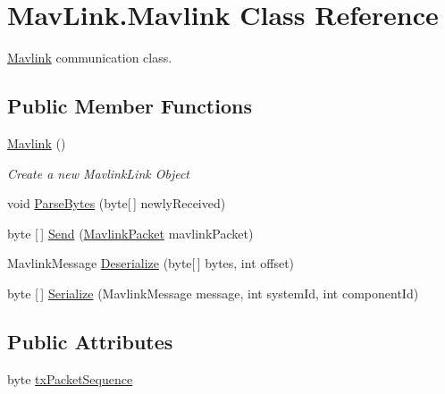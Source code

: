 \hypertarget{classMavLink_1_1Mavlink}{}\section{Mav\+Link.\+Mavlink Class Reference}
\label{classMavLink_1_1Mavlink}


\mbox{\hyperlink{classMavLink_1_1Mavlink}{Mavlink}} communication class.  


\subsection*{Public Member Functions}
\begin{DoxyCompactItemize}
\item 
\mbox{\hyperlink{classMavLink_1_1Mavlink_afe31f241e14b7a9df43494c3f777055f}{Mavlink}} ()
\begin{DoxyCompactList}\small\item\em Create a new Mavlink\+Link Object \end{DoxyCompactList}\item 
void \mbox{\hyperlink{classMavLink_1_1Mavlink_a2a1e66a440c767a640c92f00bdf5354d}{Parse\+Bytes}} (byte\mbox{[}$\,$\mbox{]} newly\+Received)
\item 
byte \mbox{[}$\,$\mbox{]} \mbox{\hyperlink{classMavLink_1_1Mavlink_a62a72045b3c41e9aade642a94af528aa}{Send}} (\mbox{\hyperlink{classMavLink_1_1MavlinkPacket}{Mavlink\+Packet}} mavlink\+Packet)
\item 
Mavlink\+Message \mbox{\hyperlink{classMavLink_1_1Mavlink_aeffd42986158db41e1e7151ae5d899f3}{Deserialize}} (byte\mbox{[}$\,$\mbox{]} bytes, int offset)
\item 
byte \mbox{[}$\,$\mbox{]} \mbox{\hyperlink{classMavLink_1_1Mavlink_ac10d67e2fbfb6e4ef9bc905b5ef2206b}{Serialize}} (Mavlink\+Message message, int system\+Id, int component\+Id)
\end{DoxyCompactItemize}
\subsection*{Public Attributes}
\begin{DoxyCompactItemize}
\item 
byte \mbox{\hyperlink{classMavLink_1_1Mavlink_a0bba1cc5192a639aead91672c03fdd96}{tx\+Packet\+Sequence}}
\end{DoxyCompactItemize}
